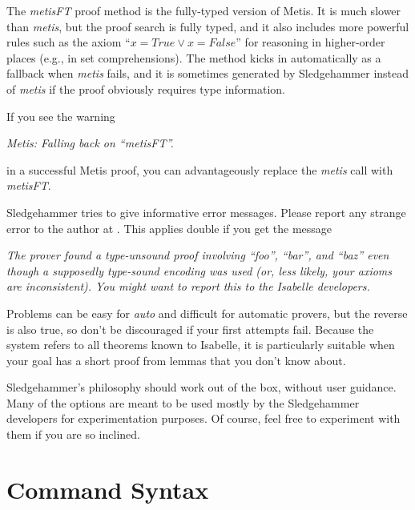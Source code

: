 \documentclass[a4paper,12pt]{article}
\begin{document}

The \textit{metisFT} proof method is the fully-typed version of Metis. It is
much slower than \textit{metis}, but the proof search is fully typed, and it
also includes more powerful rules such as the axiom ``$x = \mathit{True}
\mathrel{\lor} x = \mathit{False}$'' for reasoning in higher-order places (e.g.,
in set comprehensions). The method kicks in automatically as a fallback when
\textit{metis} fails, and it is sometimes generated by Sledgehammer instead of
\textit{metis} if the proof obviously requires type information.

If you see the warning

\prew
\slshape
Metis: Falling back on ``\textit{metisFT\/}''.
\postw

in a successful Metis proof, you can advantageously replace the \textit{metis}
call with \textit{metisFT}.


Sledgehammer tries to give informative error messages. Please report any strange
error to the author at \authoremail. This applies double if you get the message

\prew
\slshape
The prover found a type-unsound proof involving ``\textit{foo}'',
``\textit{bar}'', and ``\textit{baz}'' even though a supposedly type-sound
encoding was used (or, less likely, your axioms are inconsistent). You might
want to report this to the Isabelle developers.
\postw


Problems can be easy for \textit{auto} and difficult for automatic provers, but
the reverse is also true, so don't be discouraged if your first attempts fail.
Because the system refers to all theorems known to Isabelle, it is particularly
suitable when your goal has a short proof from lemmas that you don't know about.


Sledgehammer's philosophy should work out of the box, without user guidance.
Many of the options are meant to be used mostly by the Sledgehammer developers
for experimentation purposes. Of course, feel free to experiment with them if
you are so inclined.

\section{Command Syntax}
\label{command-syntax}
\end{document}
